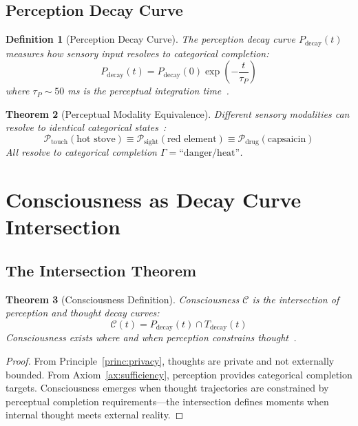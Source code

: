 \documentclass[aps,prd,twocolumn,superscriptaddress,floatfix,nofootinbib]{revtex4-2}
\newtheorem{theorem}{Theorem}[section]
\newtheorem{definition}[theorem]{Definition}
\theoremstyle{remark}
\newcommand{\Pcat}{\mathcal{P}}
\newcommand{\Ccat}{\mathcal{C}}
\newcommand{\Gstate}{\Gamma}
\newcommand{\Pdecay}{P_{\mathrm{decay}}}
\newcommand{\Tdecay}{T_{\mathrm{decay}}}
\begin{document}
\subsection{Perception Decay Curve}

\begin{definition}[Perception Decay Curve]
\label{def:perception_decay}
The perception decay curve $\Pdecay(t)$ measures how sensory input resolves to categorical completion:
\begin{equation}
\Pdecay(t) = \Pdecay(0) \exp\left(-\frac{t}{\tau_P}\right)
\end{equation}
where $\tau_P \sim 50$ ms is the perceptual integration time~\cite{thorpe1996speed,vanrullen2001temporal}.
\end{definition}

\begin{theorem}[Perceptual Modality Equivalence]
\label{thm:modality_equiv}
Different sensory modalities can resolve to identical categorical states~\cite{sachikonye2025multimodal}:
\begin{equation}
\Pcat_{\text{touch}}(\text{hot stove}) \equiv \Pcat_{\text{sight}}(\text{red element}) \equiv \Pcat_{\text{drug}}(\text{capsaicin})
\end{equation}
All resolve to categorical completion $\Gstate = \text{``danger/heat''}$.
\end{theorem}

\section{Consciousness as Decay Curve Intersection}
\label{sec:consciousness}

\subsection{The Intersection Theorem}

\begin{theorem}[Consciousness Definition]
\label{thm:consciousness}
Consciousness $\Ccat$ is the intersection of perception and thought decay curves:
\begin{equation}
\boxed{\Ccat(t) = \Pdecay(t) \cap \Tdecay(t)}
\end{equation}
Consciousness exists where and when perception constrains thought~\cite{tononi2016integrated,dehaene2014consciousness,koch2016neural}.
\end{theorem}

\begin{proof}
From Principle~\ref{princ:privacy}, thoughts are private and not externally bounded. From Axiom~\ref{ax:sufficiency}, perception provides categorical completion targets. Consciousness emerges when thought trajectories are constrained by perceptual completion requirements---the intersection defines moments when internal thought meets external reality.
\end{proof}
\end{document}
